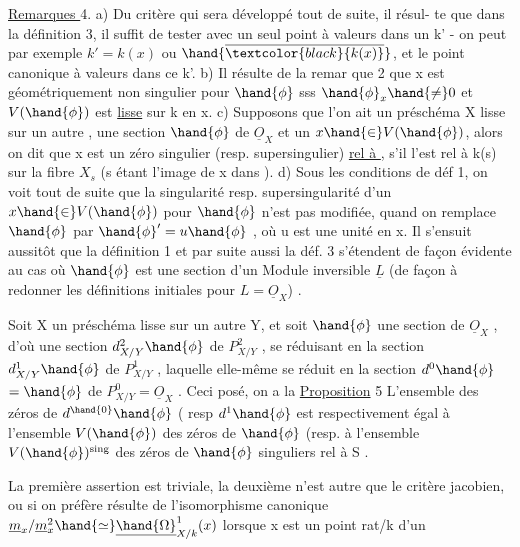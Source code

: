 
\uline{Remarques }4. a) Du  critère qui sera développé tout de suite, il résul-%
te que dans la définition 3, il suffit de tester avec un seul point
à valeurs dans un k' - on peut par exemple  $k'=k(x)$ ou $\hand{\overline{\textcolor{black}{k(x)}}}$, et
le point canonique à valeurs dans ce k'. b) Il résulte de la remar
que 2 que x est géométriquement non singulier pour $\hand{\phi}$ sss $\hand{\phi}_x \hand{\neq} 0$ et
$V(\hand{\phi})$ est \uline{lisse} sur k en x. c) Supposons que l'on ait un préschéma X lisse
sur un autre , une section $\hand{\phi}$ de $\underline{O}_X$ et un $x \hand{\in} V(\hand{\phi})$, alors on dit que x
est un zéro singulier (resp. supersingulier) \uline{rel à }, s'il l'est
rel à k(s) sur la fibre $X_s$ (s étant l'image de x dans ). d) Sous
les conditions de déf 1, on voit tout de suite que la singularité resp.
\placedmargin{$\|$} supersingularité d'un $x \hand{\in} V(\hand{\phi})$ pour $\hand{\phi}$ n'est pas modifiée, quand on
remplace $\hand{\phi}$ par $\hand{\phi}'=u\hand{\phi}$ , où u est une unité en x. Il s'ensuit aussitôt que
la  définition 1 et par suite aussi la déf. 3 s'étendent de façon
évidente au cas où $\hand{\phi}$ est une section d'un Module inversible $\underline{L}$ (de façon
à redonner les définitions initiales pour $L = \underline{O}_X$) .

 Soit X un préschéma lisse sur un
autre Y, et soit $\hand{\phi}$ une section de $\underline{O}_X$ , d'où une section $d^2_{X/Y}\hand{\phi}$ de
$P^2_{X/Y}$ , se réduisant en la section $d^1_{X/Y}\hand{\phi}$ de $P^1_{X/Y}$ , laquelle elle-même
se réduit en la section $d^0\hand{\phi}$ $=\hand{\phi}$ de $P^0_{X/Y} = \underline{O}_X$ . Ceci posé, on a la
\uline{Proposition} 5 L'ensemble des zéros de $d^{\hand{0}}\hand{\phi}$ ( resp $d^1\hand{\phi}$ \hand{)} 
 est respectivement égal à l'ensemble $V(\hand{\phi})$ des zéros de $\hand{\phi}$ (resp. à
l'ensemble $V(\hand{\phi})^{\mathrm{sing}}$ des zéros de $\hand{\phi}$ singuliers rel à S\hand{)} 
.

La première assertion est triviale, la deuxième n'est autre
que le critère jacobien, ou si on préfère résulte de l'isomorphisme
canonique $\underline{m}_x/\underline{m}_x^2 \hand{\simeq} \underline{\hand{\Omega}}^1_{X/k}(x)$ lorsque x est un point rat/k d'un


